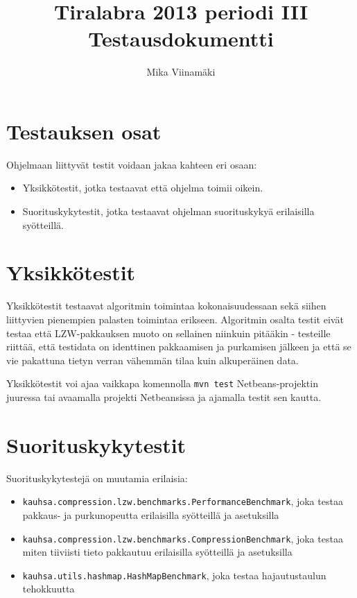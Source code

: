 \documentclass{article}
\begin{document}
\title{Tiralabra 2013 periodi III \\ Testausdokumentti}
\author{Mika Viinamäki}
\maketitle

\section{Testauksen osat}
Ohjelmaan liittyvät testit voidaan jakaa kahteen eri osaan:

\begin{itemize}
\item Yksikkötestit, jotka testaavat että ohjelma toimii oikein.
\item Suorituskykytestit, jotka testaavat ohjelman suorituskykyä erilaisilla syötteillä.
\end{itemize}

\section{Yksikkötestit}
Yksikkötestit testaavat algoritmin toimintaa kokonaisuudessaan sekä siihen liittyvien pienempien palasten toimintaa erikseen. Algoritmin osalta testit eivät testaa että LZW-pakkauksen muoto on sellainen niinkuin pitääkin - testeille riittää, että testidata on identtinen pakkaamisen ja purkamisen jälkeen ja että se vie pakattuna tietyn verran vähemmän tilaa kuin alkuperäinen data.

Yksikkötestit voi ajaa vaikkapa komennolla \texttt{mvn test} Netbeans-projektin juuressa tai avaamalla projekti Netbeansissa ja ajamalla testit sen kautta.

\section{Suorituskykytestit}

Suorituskykytestejä on muutamia erilaisia:
\begin{itemize}
\item \texttt{kauhsa.compression.lzw.benchmarks.PerformanceBenchmark}, joka testaa pakkaus- ja purkunopeutta erilaisilla syötteillä ja asetuksilla
\item \texttt{kauhsa.compression.lzw.benchmarks.CompressionBenchmark}, joka testaa miten tiiviisti tieto pakkautuu erilaisilla syötteillä ja asetuksilla
\item \texttt{kauhsa.utils.hashmap.HashMapBenchmark}, joka testaa hajautustaulun tehokkuutta
\end{itemize}
\end{document}
